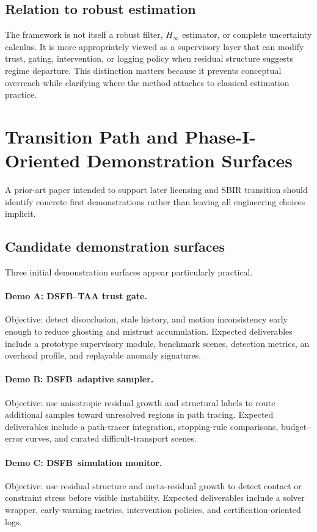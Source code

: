 \documentclass[11pt,letterpaper]{article}
\newcommand{\dsfb}{\textsc{DSFB}}
\theoremstyle{gcresult}
\theoremstyle{definition}
\begin{document}
\subsection{Relation to robust estimation}
The framework is not itself a robust filter, $H_\infty$ estimator, or complete uncertainty calculus. It is more appropriately viewed as a supervisory layer that can modify trust, gating, intervention, or logging policy when residual structure suggests regime departure. This distinction matters because it prevents conceptual overreach while clarifying where the method attaches to classical estimation practice.

\section{Transition Path and Phase-I-Oriented Demonstration Surfaces}

A prior-art paper intended to support later licensing and SBIR transition should identify concrete first demonstrations rather than leaving all engineering choices implicit.

\subsection{Candidate demonstration surfaces}
Three initial demonstration surfaces appear particularly practical.

\paragraph{Demo A: \dsfb--TAA trust gate.}
Objective: detect disocclusion, stale history, and motion inconsistency early enough to reduce ghosting and mistrust accumulation. Expected deliverables include a prototype supervisory module, benchmark scenes, detection metrics, an overhead profile, and replayable anomaly signatures.

\paragraph{Demo B: \dsfb\ adaptive sampler.}
Objective: use anisotropic residual growth and structural labels to route additional samples toward unresolved regions in path tracing. Expected deliverables include a path-tracer integration, stopping-rule comparisons, budget--error curves, and curated difficult-transport scenes.

\paragraph{Demo C: \dsfb\ simulation monitor.}
Objective: use residual structure and meta-residual growth to detect contact or constraint stress before visible instability. Expected deliverables include a solver wrapper, early-warning metrics, intervention policies, and certification-oriented logs.
\end{document}
